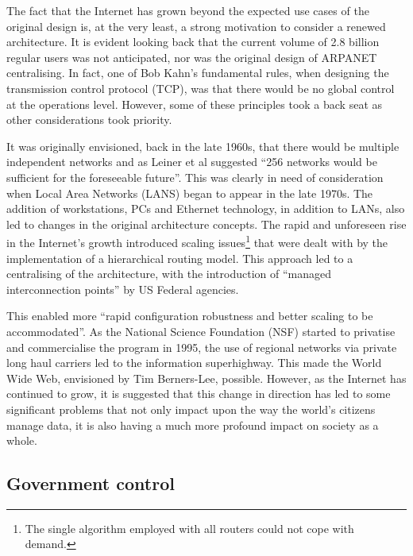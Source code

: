 \documentclass[twocolumn,english]{article}
\begin{document}
The fact that the Internet has grown beyond the expected use cases of the original design is, at the very least, a strong motivation to consider a renewed architecture. It is evident looking back that the current volume of
2.8 billion regular users\cite{mwg13} was not anticipated, nor was the original design of ARPANET centralising. In fact, one of Bob Kahn\textquoteright s fundamental rules, when designing the transmission control protocol (TCP), was that there would be no global control at the operations level\cite{isocBriefHistory}. However, some of these principles took a back seat as other considerations took priority.

It was originally envisioned, back in the late 1960s,
that there would be multiple independent networks and as Leiner et
al suggested \textquotedblleft 256 networks would be sufficient
for the foreseeable future''. This was clearly in need of consideration
when Local Area Networks (LANS) began to appear in the late 1970s. The addition of workstations, PCs and Ethernet technology, in addition to LANs, also led to changes in the original architecture
concepts. The rapid and unforeseen rise in the Internet\textquoteright s
growth introduced scaling issues\footnote{The single algorithm employed with
all routers could not cope with demand.} that were dealt with by the
implementation of a hierarchical routing model. This approach led to
a centralising of the architecture, with the introduction
of \textquotedblleft managed interconnection points\textquotedblright{}
by US Federal agencies. 

This enabled more \textquotedblleft rapid configuration robustness
and better scaling to be accommodated\textquotedblright. As the National Science Foundation (NSF) started to privatise and
commercialise the program in 1995, the use of regional networks via
private long haul carriers led to the information superhighway.  This made the World Wide Web, envisioned
by Tim Berners-Lee, possible. However, as the
Internet has continued to grow, it is suggested that this change in
direction has led to some significant problems that not only impact
upon the way the world\textquoteright s citizens manage data, it is also
having a much more profound impact on society as a whole. 


\subsection{Government control}
\end{document}
